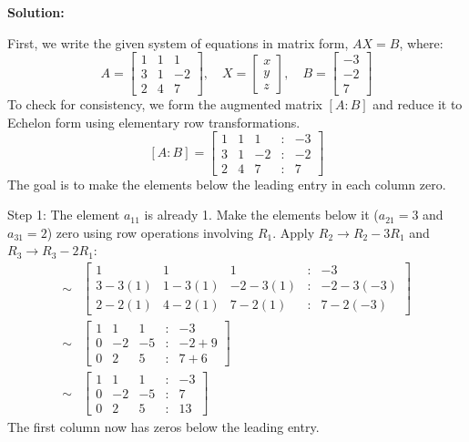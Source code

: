 \documentclass{article}
\begin{document}
\textbf{Solution:}

First, we write the given system of equations in matrix form, $AX = B$, where:
\[ A = \begin{bmatrix} 1 & 1 & 1 \\ 3 & 1 & -2 \\ 2 & 4 & 7 \end{bmatrix}, \quad X = \begin{bmatrix} x \\ y \\ z \end{bmatrix}, \quad B = \begin{bmatrix} -3 \\ -2 \\ 7 \end{bmatrix} \]
To check for consistency, we form the augmented matrix $[A:B]$ and reduce it to Echelon form using elementary row transformations.
\[ [A:B] = \begin{bmatrix} 1 & 1 & 1 & : & -3 \\ 3 & 1 & -2 & : & -2 \\ 2 & 4 & 7 & : & 7 \end{bmatrix} \]
The goal is to make the elements below the leading entry in each column zero.

Step 1: The element $a_{11}$ is already 1. Make the elements below it ($a_{21}=3$ and $a_{31}=2$) zero using row operations involving $R_1$.
Apply $R_2 \to R_2 - 3R_1$ and $R_3 \to R_3 - 2R_1$:
\begin{align*} \sim &\begin{bmatrix} 1 & 1 & 1 & : & -3 \\ 3 - 3(1) & 1 - 3(1) & -2 - 3(1) & : & -2 - 3(-3) \\ 2 - 2(1) & 4 - 2(1) & 7 - 2(1) & : & 7 - 2(-3) \end{bmatrix} \\ \sim &\begin{bmatrix} 1 & 1 & 1 & : & -3 \\ 0 & -2 & -5 & : & -2 + 9 \\ 0 & 2 & 5 & : & 7 + 6 \end{bmatrix} \\ \sim &\begin{bmatrix} 1 & 1 & 1 & : & -3 \\ 0 & -2 & -5 & : & 7 \\ 0 & 2 & 5 & : & 13 \end{bmatrix}\end{align*}
The first column now has zeros below the leading entry.
\end{document}
